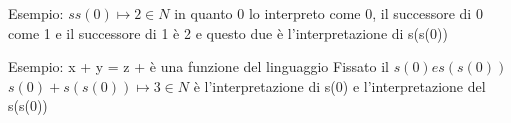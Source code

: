 



Esempio:
$s s(0) \mapsto 2 \in N$ in quanto 0 lo interpreto come 0, il successore di 0 come 1 e il successore di 1 è 2 e questo due è l'interpretazione di s(s(0))



Esempio:
x + y = z    + è una funzione del linguaggio
Fissato il $s(0) e s(s(0))$
$s(0) + s(s(0)) \mapsto 3 \in N$ è l'interpretazione di s(0) e l'interpretazione del s(s(0))
